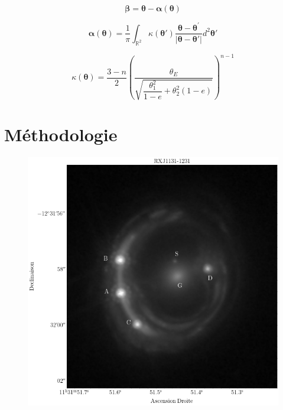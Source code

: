 \documentclass[times,10pt,twocolumn]{article}
\begin{document}
\begin{equation}\label{eq:LensEquation} 
        \boldsymbol{\beta} = \boldsymbol{\theta} - \boldsymbol{\alpha}(\boldsymbol{\theta})
\end{equation} 

\begin{equation}\label{eq:DeflectinAngle} 
        \boldsymbol{\alpha}(\boldsymbol{\theta}) = \frac{1}{\pi} \int_{\mathbb{R}^{2}} \kappa(\boldsymbol{\theta}')
        \frac{\boldsymbol{\theta} - \boldsymbol{\theta}^{'}}{|\boldsymbol{\theta} - \boldsymbol{\theta}'|}
        d^{2}\boldsymbol{\theta}'
\end{equation} 

\begin{equation}\label{eq:Kappa} 
        \kappa(\boldsymbol{\theta}) = \frac{3 - n}{2} 
        \left( 
        \frac{\theta_E}{\sqrt{\dfrac{\theta_1^2}{1 - e} + \theta_2^2(1 - e)}}
\right)^{n- 1} 
\end{equation} 
\section{Méthodologie}\label{sec:metho}
\begin{figure}[H]
        \centering
        \includegraphics[width=0.8\linewidth]{good_cutout}
        \caption{}
        \label{fig:rxj1131}
\end{figure}
\end{document}
